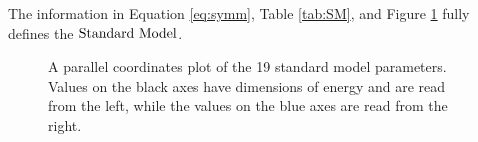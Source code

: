 The information in Equation \ref{eq:symm}, Table \ref{tab:SM}, and Figure \ref{fig:parcorSM} fully defines the $\text{Standard\ Model}$.
\begin{figure}
\begin{centering}
\caption{A parallel coordinates plot of the 19 standard model parameters. Values on the black axes have dimensions of energy and are read from the left, while the values on the blue axes are read from the right.}
\label{fig:parcorSM}
\end{centering}
\end{figure}


